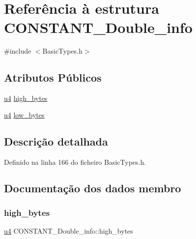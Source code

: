 \hypertarget{structCONSTANT__Double__info}{}\section{Referência à estrutura C\+O\+N\+S\+T\+A\+N\+T\+\_\+\+Double\+\_\+info}
\label{structCONSTANT__Double__info}


{\ttfamily \#include $<$Basic\+Types.\+h$>$}

\subsection*{Atributos Públicos}
\begin{DoxyCompactItemize}
\item 
\hyperlink{BasicTypes_8h_ae5be1f726785414dd1b77d60df074c9d}{u4} \hyperlink{structCONSTANT__Double__info_a598a15e5dbec46b4fb2546fd985a4028}{high\+\_\+bytes}
\item 
\hyperlink{BasicTypes_8h_ae5be1f726785414dd1b77d60df074c9d}{u4} \hyperlink{structCONSTANT__Double__info_acb94347bd17a80b4a11d6ee35ae1eee3}{low\+\_\+bytes}
\end{DoxyCompactItemize}


\subsection{Descrição detalhada}


Definido na linha 166 do ficheiro Basic\+Types.\+h.



\subsection{Documentação dos dados membro}
\mbox{\label{structCONSTANT__Double__info_a598a15e5dbec46b4fb2546fd985a4028}} 
\subsubsection{\texorpdfstring{high\+\_\+bytes}{high\_bytes}}
{\footnotesize\ttfamily \hyperlink{BasicTypes_8h_ae5be1f726785414dd1b77d60df074c9d}{u4} C\+O\+N\+S\+T\+A\+N\+T\+\_\+\+Double\+\_\+info\+::high\+\_\+bytes}



